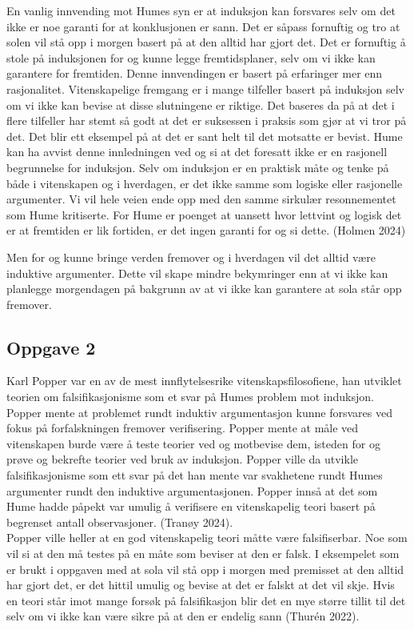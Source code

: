 \documentclass[
  letterpaper,
  DIV=11,
  numbers=noendperiod]{scrreprt}
\begin{document}
En vanlig innvending mot Humes syn er at induksjon kan forsvares selv om
det ikke er noe garanti for at konklusjonen er sann. Det er såpass
fornuftig og tro at solen vil stå opp i morgen basert på at den alltid
har gjort det. Det er fornuftig å stole på induksjonen for og kunne
legge fremtidsplaner, selv om vi ikke kan garantere for fremtiden. Denne
innvendingen er basert på erfaringer mer enn rasjonalitet.
Vitenskapelige fremgang er i mange tilfeller basert på induksjon selv om
vi ikke kan bevise at disse slutningene er riktige. Det baseres da på at
det i flere tilfeller har stemt så godt at det er suksessen i praksis
som gjør at vi tror på det. Det blir ett eksempel på at det er sant helt
til det motsatte er bevist. Hume kan ha avvist denne innledningen ved og
si at det foresatt ikke er en rasjonell begrunnelse for induksjon. Selv
om induksjon er en praktisk måte og tenke på både i vitenskapen og i
hverdagen, er det ikke samme som logiske eller rasjonelle argumenter. Vi
vil hele veien ende opp med den samme sirkulær resonnementet som Hume
kritiserte. For Hume er poenget at uansett hvor lettvint og logisk det
er at fremtiden er lik fortiden, er det ingen garanti for og si dette.
(Holmen 2024)

Men for og kunne bringe verden fremover og i hverdagen vil det alltid
være induktive argumenter. Dette vil skape mindre bekymringer enn at vi
ikke kan planlegge morgendagen på bakgrunn av at vi ikke kan garantere
at sola står opp fremover.

\subsection{Oppgave 2}\label{oppgave-2-1}

Karl Popper var en av de mest innflytelsesrike vitenskapsfilosofiene,
han utviklet teorien om falsifikasjonisme som et svar på Humes problem
mot induksjon. Popper mente at problemet rundt induktiv argumentasjon
kunne forsvares ved fokus på forfalskningen fremover verifisering.
Popper mente at måle ved vitenskapen burde være å teste teorier ved og
motbevise dem, isteden for og prøve og bekrefte teorier ved bruk av
induksjon. Popper ville da utvikle falsifikasjonisme som ett svar på det
han mente var svakhetene rundt Humes argumenter rundt den induktive
argumentasjonen. Popper innså at det som Hume hadde påpekt var umulig å
verifisere en vitenskapelig teori basert på begrenset antall
observasjoner. (Tranøy 2024).\\
Popper ville heller at en god vitenskapelig teori måtte være
falsifiserbar. Noe som vil si at den må testes på en måte som beviser at
den er falsk. I eksempelet som er brukt i oppgaven med at sola vil stå
opp i morgen med premisset at den alltid har gjort det, er det hittil
umulig og bevise at det er falskt at det vil skje. Hvis en teori står
imot mange forsøk på falsifikasjon blir det en mye større tillit til det
selv om vi ikke kan være sikre på at den er endelig sann (Thurén 2022).
\end{document}
